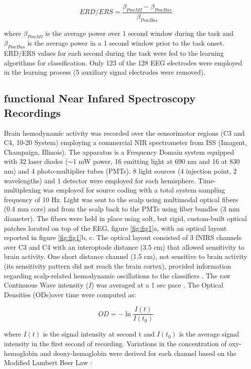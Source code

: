 \documentclass[12pt]{iopart}
\begin{document}
\begin{equation}
\label{eqn:erders}
ERD/ERS=\frac{\beta_{PowMI}-\beta_{PowBas}}{\beta_{PowBas}}
\end{equation} 

where $\beta_{PowMI}$ is the average power over 1 second window during the task and $\beta_{PowBas}$ is the average power in a 1 second window prior to the task onset.
ERD/ERS values for each second during the task were fed to the learning algorithms for classification. Only 123 of the 128 EEG electrodes were employed in the learning process (5 auxiliary signal electrodes were removed).

\subsection{functional Near Infared Spectroscopy Recordings}
Brain hemodynamic activity was recorded over the sensorimotor regions (C3 and C4, 10-20 System) employing a commercial NIR spectrometer from ISS (Imagent, Champaign, Illinois).
The apparatus is a Frequency Domain system equipped with 32 laser diodes ($\sim$1 mW  power, 16 emitting light at 690 nm and 16 at 830 nm) and 4 photo-multiplier tubes (PMTs). 
8 light sources (4 injection point, 2 wavelengths) and 1 detector were employed for each hemisphere. Time-multiplexing was employed for source coding with a total system sampling frequency of 10 Hz.  Light was sent to the scalp using multimodal optical fibers (0.4 mm core) and from the scalp back to the PMTs using fiber bundles (3 mm diameter).  The fibers were held in place using soft, but rigid, custom-built optical patches located on top of the EEG, figure \ref{fig:fig1}a, with an optical layout reported in figure \ref{fig:fig1}b, c. The optical layout consisted of 3 fNIRS channels over C3 and C4 with an interoptode distance (3.5 cm) that allowed sensitivity to brain activity. One short distance channel (1.5 cm),  not sensitive to brain activity (its sensitivity pattern did not reach the brain cortex), provided information regarding scalp-related hemodynamic oscillations to the classifiers \parencite{gagnon2014further}.  
The raw Continuous Wave intensity ($I$)  was averaged  at a 1 sec pace .
The Optical Densities (ODs)over time were computed as:

\begin{equation}
\label{eqn:erders}
OD=-\ln\frac{I(t)}{I(t_{0})}
\end{equation} 

where $I(t)$ is the signal intensity at second t and $I(t_{0})$ is the average signal intensity in the first second of recording.
Variations in the concentration of oxy-hemoglobin and deoxy-hemoglobin were derived for each channel  based on the Modified Lambert Beer Law \parencite{sassaroli2004comment}:
\end{document}
